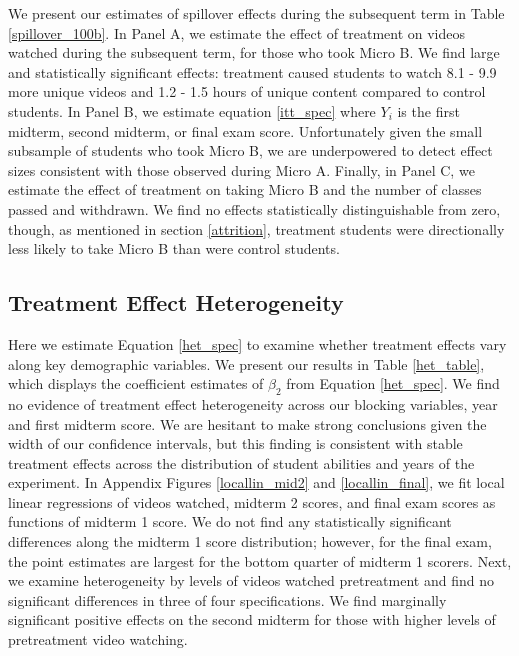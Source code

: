 \documentclass[12pt]{article}
\begin{document}
We present our estimates of spillover effects during the subsequent term in Table \ref{spillover_100b}. In Panel A, we estimate the effect of treatment on videos watched during the subsequent term, for those who took Micro B. We find large and statistically significant effects: treatment caused students to watch 8.1 - 9.9 more unique videos and 1.2 - 1.5 hours of unique content compared to control students. In Panel B, we estimate equation \ref{itt_spec} where $Y_i$ is the first midterm, second midterm, or final exam score. Unfortunately given the small subsample of students who took Micro B, we are underpowered to detect effect sizes consistent with those observed during Micro A. Finally, in Panel C, we estimate the effect of treatment on taking Micro B and the number of classes passed and withdrawn. We find no effects statistically distinguishable from zero, though, as mentioned in section \ref{attrition}, treatment students were directionally less likely to take Micro B than were control students.

\subsection{Treatment Effect Heterogeneity}

Here we estimate Equation \ref{het_spec} to examine whether treatment effects vary along key demographic variables. We present our results in Table \ref{het_table}, which displays the coefficient estimates of $\beta_2$ from Equation \ref{het_spec}. We find no evidence of treatment effect heterogeneity across our blocking variables, year and first midterm score. We are hesitant to make strong conclusions given the width of our confidence intervals, but this finding is consistent with stable treatment effects across the distribution of student abilities and years of the experiment. In Appendix Figures \ref{locallin_mid2} and \ref{locallin_final}, we fit local linear regressions of videos watched, midterm 2 scores, and final exam scores as functions of midterm 1 score. We do not find any statistically significant differences along the midterm 1 score distribution; however, for the final exam, the point estimates are largest for the bottom quarter of midterm 1 scorers. Next, we examine heterogeneity by levels of videos watched pretreatment and find no significant differences in three of four specifications. We find marginally significant positive effects on the second midterm for those with higher levels of pretreatment video watching.
\end{document}

